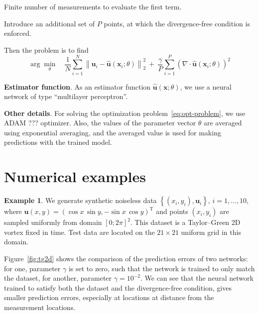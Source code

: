 \documentclass[pamm,a4paper,fleqn]{w-art}
\newcommand{\T}{\ensuremath{\text{T}}}
\renewcommand{\vec}[1]{\boldsymbol{#1}}
\newcommand{\norm}[1]{\left\lVert#1\right\rVert}
\begin{document}
Finite number of measurements to evaluate the first term. 

Introduce an additional set of $P$ points, at which
the divergence-free condition is enforced.

Then the problem is to find
\[
  \arg \min_\theta \quad
  \frac{1}{N} \sum_{i=1}^N \norm{\vec u_i - \hat{\vec u}(\vec x_i; \theta)}^2_2
  \ + \ 
  \frac{\gamma}{P} \sum_{i=1}^P \left( \nabla \cdot \hat{\vec u}(\vec x_i; \theta)\right)^2
\]

\textbf{Estimator function}.
As an estimator function $\hat{\vec u}(\vec x; \theta)$, we use a neural network
of type ``multilayer perceptron''.

\textbf{Other details}.
For solving the optimization problem~\eqref{eq:opt-problem}, we use ADAM ???
optimizer.
Also, the values of the parameter vector $\theta$ are averaged using exponential
averaging, and the averaged value is used for making predictions with the
trained model.

\section{Numerical examples}

\textbf{Example 1}.
We generate synthetic noiseless data
  $\left\{(x_i, y_i), \vec{u}_i\right\}$, $i = 1, \dots, 10$,
where $\vec u(x, y) = ( \cos x \, \sin y, -\sin x \, \cos y)^\T$
and points $(x_i, y_i)$ are sampled uniformly from domain $[0; 2\pi]^2$.
This dataset is a Taylor--Green 2D vortex fixed in time.
Test data are located on the $21\times21$ uniform grid in this domain.

Figure~\ref{fig:tg2d} shows the comparison of the prediction errors of two
networks: for one, parameter $\gamma$ is set to zero, such that the network is
trained to only match the dataset, for another, parameter $\gamma = 10^{-2}$.
We can see that the neural network trained to satisfy both  the dataset and the
divergence-free condition, gives smaller prediction errors, especially at
locations at distance from the measurement locations.
\end{document}
